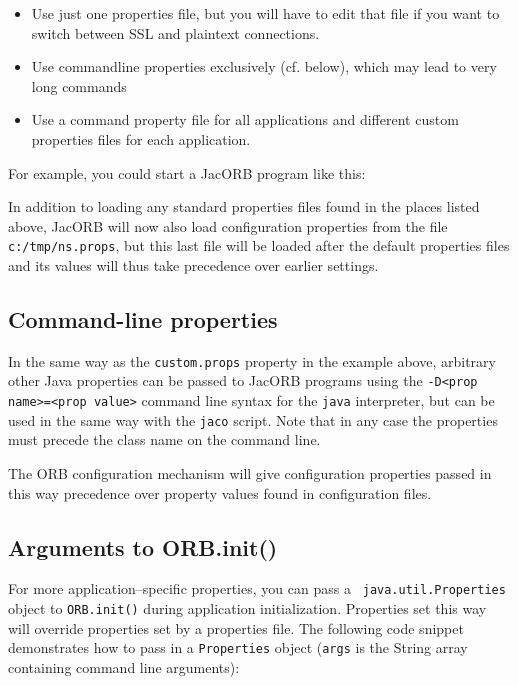 \begin{itemize}
\item Use just one properties file, but you will have to edit that
  file if you want to switch between SSL and
plaintext connections. 
\item Use commandline properties exclusively (cf. below), which may lead to very long
commands
\item Use a command property file for all applications and different
  custom properties files for each application.
\end{itemize}

For example, you could   start a JacORB program like this: 


In addition to loading any standard properties files found in the
places listed above, JacORB will now also load configuration
properties from the file {\tt c:/tmp/ns.props}, but this last file
will be loaded after the default properties files and its values will
thus take precedence over earlier settings.

\subsection{Command-line properties}

In the same way as the {\tt custom.props} property in the example
above, arbitrary other Java properties can be passed to JacORB
programs using the {\tt -D<prop name>=<prop value>} command line syntax
for the {\tt java} interpreter, but can be used in the same way with
the {\tt jaco} script. Note that in any case the properties must
precede the class name on the command line.

The ORB configuration mechanism will
give configuration properties passed in this way precedence over
property values found in configuration files.

\subsection{Arguments to ORB.init()}

For more application--specific properties, you can pass a {\tt
 java.util.Properties} object to {\tt ORB.init()} during application
initialization. Properties set this way will override properties set
by a properties file. The following code snippet demonstrates how to
pass in a {\tt Properties} object ({\tt args} is the String array
containing command line arguments):

